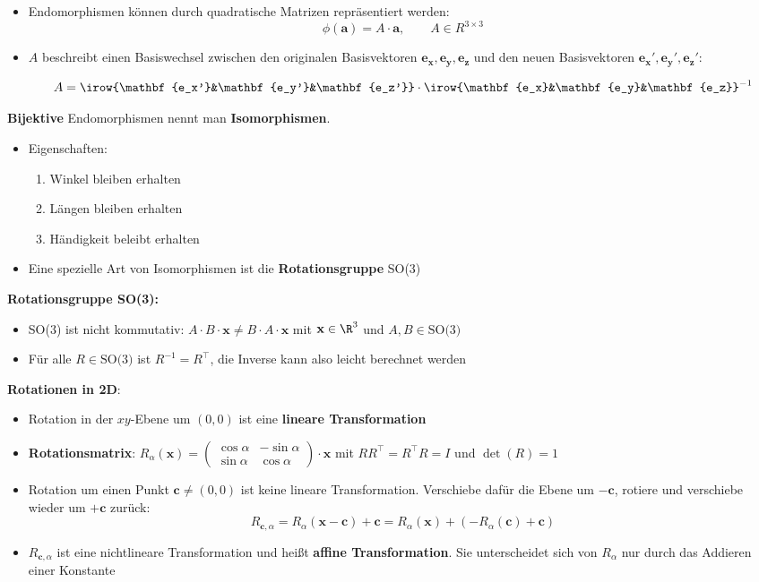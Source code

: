 \begin{itemize}
	\item Endomorphismen können durch quadratische Matrizen repräsentiert werden: $$\phi(\mathbf{a})=A\cdot\mathbf{a},\qquad A\in R^{3\times 3}$$
	\item $A$ beschreibt einen Basiswechsel zwischen den originalen Basisvektoren $\mathbf{e_x}, \mathbf{e_y}, \mathbf{e_z}$ und den neuen Basisvektoren $\mathbf{e_x'}, \mathbf{e_y'}, \mathbf{e_z'}$:
	
	$$A=\irow{\mathbf{e_x'}&\mathbf{e_y'}&\mathbf{e_z'}}\cdot\irow{\mathbf{e_x}&\mathbf{e_y}&\mathbf{e_z}}^{-1}$$
\end{itemize}

\textbf{Bijektive} Endomorphismen nennt man \textbf{Isomorphismen}.
\begin{itemize}
	\item Eigenschaften:
	\begin{enumerate}
		\item Winkel bleiben erhalten
		\item Längen bleiben erhalten
		\item Händigkeit beleibt erhalten
	\end{enumerate}
	\item Eine spezielle Art von Isomorphismen ist die \textbf{Rotationsgruppe} SO(3)
\end{itemize}
\medskip
\textbf{Rotationsgruppe SO(3):}
\begin{itemize}
	\item SO(3) ist nicht kommutativ: $A\cdot B\cdot \mathbf{x}\neq B\cdot A\cdot \mathbf{x}$ mit $\mathbf{x}\in\R^3$ und $A,B\in\text{SO(3)}$ 
	\item Für alle $R\in\text{SO(3)}$ ist $R^{-1}=R^\top$, die Inverse kann also leicht berechnet werden
\end{itemize}
\pagebreak
\textbf{Rotationen in 2D}:
\begin{itemize}
	\item Rotation in der $xy$-Ebene um $(0,0)$ ist eine \textbf{lineare Transformation}
	\item \textbf{Rotationsmatrix}: $R_\alpha(\mathbf{x})=
	\left(\begin{matrix}
		\cos\alpha & -\sin\alpha \\
		\sin\alpha & \cos\alpha 
	\end{matrix}\right)\cdot\mathbf{x}$
	mit $RR^\top=R^\top R=I$ und $\det(R)=1$
	\item Rotation um einen Punkt $\mathbf{c}\neq(0,0)$ ist keine lineare Transformation.
	Verschiebe dafür die Ebene um $-\mathbf{c}$, rotiere und verschiebe wieder um $+\mathbf{c}$ zurück:
	$$R_{\mathbf{c},\alpha}=R_\alpha(\mathbf{x}-\mathbf{c})+\mathbf{c}= R_\alpha(\mathbf{x})+(-R_\alpha(\mathbf{c})+\mathbf{c})$$
	\item $R_{\mathbf{c},\alpha}$ ist eine nichtlineare Transformation und heißt \textbf{affine Transformation}.
	Sie unterscheidet sich von $R_\alpha$ nur durch das Addieren einer Konstante
\end{itemize}
